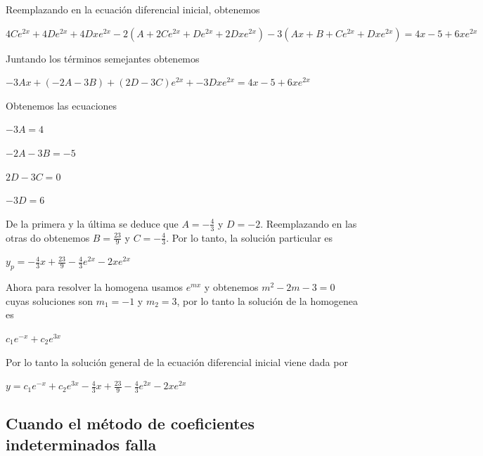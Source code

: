 \documentclass{article}
\theoremstyle{plain}
\theoremstyle{definition}
\begin{document}
Reemplazando en la ecuación diferencial inicial, obtenemos

\begin{center}
$4Ce^{2x}+ 4De^{2x}+4Dxe^{2x} -2(A+2Ce^{2x}+De^{2x}+2Dxe^{2x})-3(Ax+B+Ce^{2x}+Dxe^{2x})= 4x-5+6xe^{2x}$
\end{center}

Juntando los términos semejantes obtenemos

\begin{center}
$-3Ax +(-2A-3B)+ (2D-3C)e^{2x}+ -3Dxe^{2x}= 4x-5+6xe^{2x}$
\end{center}

Obtenemos las ecuaciones

\begin{center}
$-3A=4$
\end{center}

\begin{center}
$-2A-3B=-5$
\end{center}

\begin{center}
$2D-3C=0$
\end{center}
\begin{center}
$-3D= 6$
\end{center}

De la primera y la última se deduce que $A= \displaystyle -\frac{4}{3}$ y $D= \displaystyle -2$. Reemplazando en las otras do obtenemos $B= \displaystyle \frac{23}{9}$ y $C= \displaystyle -\frac{4}{3}$. Por lo tanto, la solución particular es

\begin{center}
$\displaystyle y_p= -\frac{4}{3}x + \frac{23}{9} -\frac{4}{3}e^{2x}-2xe^{2x}$
\end{center}

Ahora para resolver la homogena usamos $e^{mx}$ y obtenemos $m^2-2m-3 =0$ cuyas soluciones son $m_1=-1$ y $m_2=3$, por lo tanto la solución de la homogenea es

\begin{center}
$c_1e^{-x}+c_2e^{3x}$
\end{center}

Por lo tanto la solución general de la ecuación diferencial inicial viene dada por


\begin{center}
$y= \displaystyle c_1e^{-x}+c_2e^{3x} -\frac{4}{3}x + \frac{23}{9} -\frac{4}{3}e^{2x}-2xe^{2x}$
\end{center}

\subsection{Cuando el método de coeficientes indeterminados falla}
\end{document}
